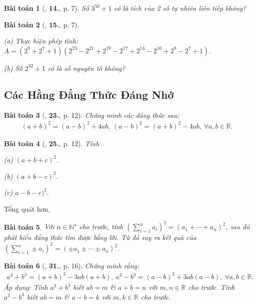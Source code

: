 \documentclass{article}
\numberwithin{equation}{section}
\newtheorem{baitoan}{Bài toán}[section]
\begin{document}
\begin{baitoan}[\cite{Binh_Toan_8_tap_1}, \textbf{14.}, p. 7]
	Số $3^{50} + 1$ có là tích của 2 số tự nhiên liên tiếp không?
\end{baitoan}

\begin{baitoan}[\cite{Binh_Toan_8_tap_1}, \textbf{15.}, p. 7]
	\begin{enumerate*}
		\item[(a)] Thực hiện phép tính: $A = (2^9 + 2^7 + 1)(2^{23} - 2^{21} + 2^{19} - 2^{17} + 2^{14} - 2^{10} + 2^9 - 2^7 + 1)$.
		\item[(b)] Số $2^{32} + 1$ có là số nguyên tố không?
	\end{enumerate*}
\end{baitoan}


\subsection{Các Hằng Đẳng Thức Đáng Nhớ}

\begin{baitoan}[\cite{SGK_Toan_8_tap_1}, \textbf{23.}, p. 12]
	Chứng minh các đẳng thức sau:
	\begin{align*}
		(a + b)^2 = (a - b)^2 + 4ab,\ (a - b)^2 = (a + b)^2 - 4ab,\ \forall a,b\in\mathbb{R}.
	\end{align*}
\end{baitoan}

\begin{baitoan}[\cite{SGK_Toan_8_tap_1}, \textbf{25.}, p. 12]
	Tính
	\begin{enumerate*}
		\item[(a)] $(a + b + c)^2$.
		\item[(b)] $(a + b - c)^2$.
		\item[(c)] $a - b - c)^2$.
	\end{enumerate*}
\end{baitoan}
Tổng quát hơn,
\begin{baitoan}
	Với $n\in\mathbb{N}^\star$ cho trước, tính $\left(\sum_{i=1}^n a_i\right)^2 = (a_1 + \cdots + a_n)^2$, sau đó phát biểu đẳng thức tìm được bằng lời. Từ đó suy ra kết quả của $\left(\sum_{i=1}^n \pm a_i\right)^2 = (\pm a_1\pm\cdots\pm a_n)^2$.
\end{baitoan}

\begin{baitoan}[\cite{SGK_Toan_8_tap_1}, \textbf{31.}, p. 16]
	Chứng minh rằng:
	\begin{align*}
		a^3 + b^3 = (a + b)^3 - 3ab(a + b),\ a^3 - b^3 = (a - b)^3 + 3ab(a - b),\ \forall a,b\in\mathbb{R}.
	\end{align*}
	Áp dụng: Tính $a^3 + b^3$ biết $ab = m$ \& $a + b = n$ với $m,n\in\mathbb{R}$ cho trước. Tính $a^3 - b^3$ biết $ab = m$ \& $a - b = k$ với $m,k\in\mathbb{R}$ cho trước.
\end{baitoan}
\end{document}
